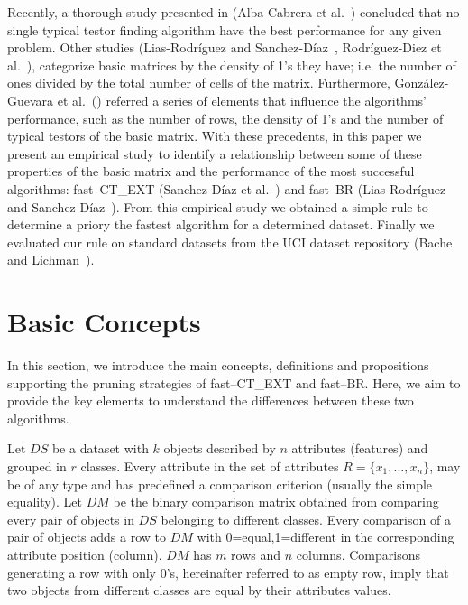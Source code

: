 \documentclass[citeauthoryear]{llncs}
\begin{document}
	Recently, a thorough study presented in (Alba-Cabrera et al.~\cite{Alba13}) concluded that no single typical testor finding algorithm have the best performance for any given problem. Other studies (Lias-Rodr\'iguez and Sanchez-D\'iaz~\cite{Lias2013}, Rodríguez-Diez et al.~\cite{Rodriguez15}), categorize basic matrices by the density of 1's they have; i.e. the number of ones divided by the total number of cells of the matrix. Furthermore, González-Guevara et al.~(\cite{Gonzalez15}) referred a series of elements that influence the algorithms' performance, such as the number of rows, the density of 1's and the number of typical testors of the basic matrix. With these precedents, in this paper we present an empirical study to identify a relationship between some of these properties of the basic matrix and the performance of the most successful algorithms:  fast--CT\_EXT (Sanchez-D\'iaz et al.~\cite{Sanchez2010}) and fast--BR (Lias-Rodr\'iguez and Sanchez-D\'iaz~\cite{Lias2013}). From this empirical study we obtained a simple rule to determine a priory the fastest algorithm for a determined dataset. Finally we evaluated our rule on standard datasets from the UCI dataset repository (Bache and Lichman~\cite{Bache13}). 
	
%
\section{Basic Concepts}
%
	In this section, we introduce the main concepts, definitions and propositions supporting the pruning strategies of fast--CT\_EXT and fast--BR. Here, we aim to provide the key elements to understand the differences between these two algorithms. 
	
	Let $DS$ be a dataset with $k$ objects described by $n$ attributes (features) and grouped in $r$ classes. Every attribute in the set of attributes $R=\lbrace x_1,...,x_n \rbrace$, may be of any type and has predefined a comparison criterion (usually the simple equality). Let $DM$ be the binary comparison matrix obtained from comparing every pair of objects in $DS$ belonging to different classes. Every comparison of a pair of objects adds a row to $DM$ with 0=equal,1=different in the corresponding attribute position (column). $DM$ has $m$ rows and $n$ columns. Comparisons generating a row with only 0's, hereinafter referred to as empty row, imply that two objects from different classes are equal by their attributes values. 
	
\end{document}
